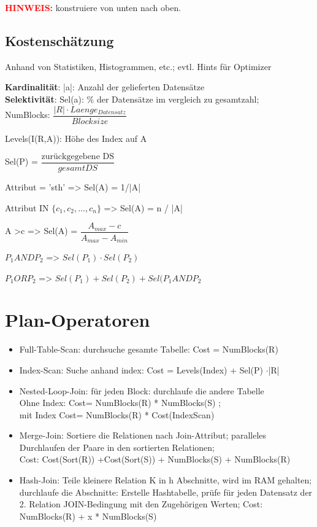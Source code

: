 \textbf{\textcolor{red}{HINWEIS:}} konstruiere von unten nach oben.

\subsection{Kostenschätzung}
Anhand von Statistiken, Histogrammen, etc.; evtl. Hints für Optimizer

\textbf{Kardinalität}: |a|: Anzahl der gelieferten Datensätze \\
\textbf{Selektivität}: Sel(a): \% der Datensätze im vergleich zu gesamtzahl;\\
NumBlocks: $\dfrac{|R|\cdot Laenge_{Datensatz}}{Blocksize}$

Levels(I(R,A)): Höhe des Index auf A

Sel(P) = $\dfrac{\text{zurückgegebene DS}}{gesamt DS}$

Attribut = 'sth' => Sel(A) = 1/|A|

Attribut IN $\{c_1,c_2, \dots , c_n\}$ => Sel(A) = n / |A|

A >c => Sel(A) = $\dfrac{A_{max} -c }{A_{max} - A_{min}}$

$P_1 AND P_2$ => $Sel(P_1) \cdot Sel(P_2)$

$P_1 OR P_2$ => $Sel(P_1) + Sel(P_2) + Sel(P_1 AND P_2$

\section{Plan-Operatoren}
\begin{itemize}
\item Full-Table-Scan: durchsuche gesamte Tabelle: Cost = NumBlocks(R)
\item Index-Scan: Suche anhand index: Cost = Levels(Index) + Sel(P) $\cdot$|R|
\item Nested-Loop-Join: für jeden Block: durchlaufe die andere Tabelle\\
Ohne Index: Cost= NumBlocks(R) * NumBlocks(S) ; \\
mit Index Cost= NumBlocks(R) * Cost(IndexScan)
\item Merge-Join: Sortiere die Relationen nach Join-Attribut; paralleles Durchlaufen der Paare in den sortierten Relationen;\\
Cost: Cost(Sort(R)) +Cost(Sort(S)) + NumBlocks(S) + NumBlocks(R)
\item Hash-Join: Teile kleinere Relation K in h Abschnitte, wird im RAM gehalten;\\
durchlaufe die Abschnitte: Erstelle Hashtabelle, prüfe für jeden Datensatz der 2. Relation JOIN-Bedingung mit den Zugehörigen Werten; Cost: NumBlocks(R) + x * NumBlocks(S)

\end{itemize}